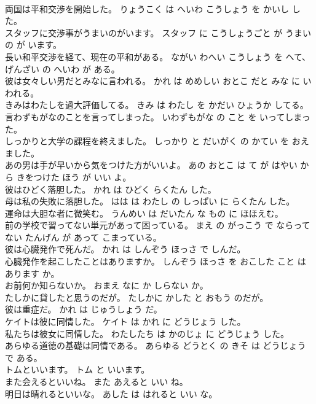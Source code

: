 \documentclass[8pt]{extreport}
\begin{document}
\begin{CJK}{UTF8}{min}
\\	両国は平和交渉を開始した。	りょうこく は へいわ こうしょう を かいし した。	
\\	スタッフに交渉事がうまいのがいます。	スタッフ に こうしょうごと が うまい の が います。	
\\	長い和平交渉を経て、現在の平和がある。	ながい わへい こうしょう を へて、げんざい の へいわ が ある。	
\\	彼は女々しい男だとみなに言われる。	かれ は めめしい おとこ だと みな に いわれる。	
\\	きみはわたしを過大評価してる。	きみ は わたし を かだい ひょうか してる。	
\\	言わずもがなのことを言ってしまった。	いわずもがな の こと を いってしまった。	
\\	しっかりと大学の課程を終えました。	しっかり と だいがく の かてい を おえました。	
\\	あの男は手が早いから気をつけた方がいいよ。	あの おとこ は て が はやい から きをつけた ほう が いい よ。	
\\	彼はひどく落胆した。	かれ は ひどく らくたん した。	
\\	母は私の失敗に落胆した。	はは は わたし の しっぱい に らくたん した。	
\\	運命は大胆な者に微笑む。	うんめい は だいたん な もの に ほほえむ。	
\\	前の学校で習ってない単元があって困っている。	まえ の がっこう で ならってない たんげん が あって こまっている。	
\\	彼は心臓発作で死んだ。	かれ は しんぞう ほっさ で しんだ。	
\\	心臓発作を起こしたことはありますか。	しんぞう ほっさ を おこした こと は あります か。	
\\	お前何か知らないか。	おまえ なに か しらない か。	
\\	たしかに貸したと思うのだが。	たしかに かした と おもう のだが。	
\\	彼は重症だ。	かれ は じゅうしょう だ。	
\\	ケイトは彼に同情した。	ケイト は かれ に どうじょう した。	
\\	私たちは彼女に同情した。	わたしたち は かのじょ に どうじょう した。	
\\	あらゆる道徳の基礎は同情である。	あらゆる どうとく の きそ は どうじょう で ある。	
\\	トムといいます。	トム と いいます。	
\\	また会えるといいね。	また あえると いい ね。	
\\	明日は晴れるといいな。	あした は はれると いい な。	

\end{CJK}
\end{document}
